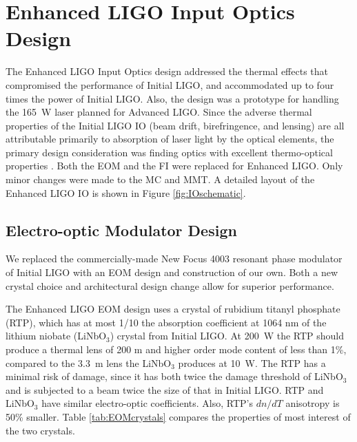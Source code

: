 \section{Enhanced LIGO Input Optics Design}
\label{sec:design}
The Enhanced LIGO Input Optics design addressed the thermal effects
that compromised the performance of Initial LIGO, and accommodated up
to four times the power of Initial LIGO. Also, the design was a
prototype for handling the 165~W laser planned for Advanced
LIGO. Since the adverse thermal properties of the Initial LIGO IO
(beam drift, birefringence, and lensing) are all attributable
primarily to absorption of laser light by the optical elements, the
primary design consideration was finding optics with excellent
thermo-optical properties \citep{UFLIGOGroup2006Upgrading}. Both the
EOM and the FI were replaced for Enhanced LIGO. Only minor changes
were made to the MC and MMT. A detailed layout of the Enhanced LIGO IO
is shown in Figure \ref{fig:IOschematic}.


\subsection{Electro-optic Modulator Design}
We replaced the commercially-made New Focus 4003 resonant phase
modulator of Initial LIGO with an EOM design and construction of our
own. Both a new crystal choice and architectural design change allow
for superior performance.

The Enhanced LIGO EOM design uses a crystal of rubidium titanyl
phosphate (RTP), which has at most 1/10 the absorption coefficient at
1064 nm of the lithium niobate (LiNbO$_3$) crystal from Initial
LIGO. At 200~W the RTP should produce a thermal lens of 200 m and
higher order mode content of less than 1\%, compared to the 3.3~m lens
the LiNbO$_3$ produces at 10~W. The RTP has a minimal risk of damage,
since it has both twice the damage threshold of LiNbO$_3$ and is
subjected to a beam twice the size of that in Initial LIGO. RTP and
LiNbO$_3$ have similar electro-optic coefficients. Also, RTP's $dn/dT$
anisotropy is 50\% smaller. Table \ref{tab:EOMcrystals} compares the
properties of most interest of the two crystals.

